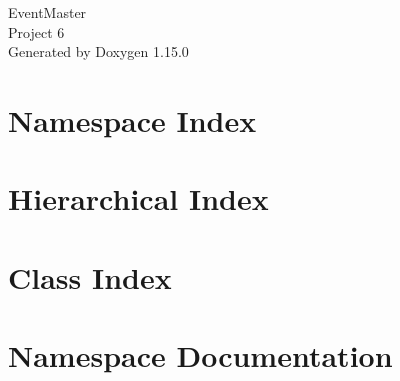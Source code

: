 \documentclass[twoside]{book}
\newcommand{\+}{\discretionary{\mbox{\scriptsize$\hookleftarrow$}}{}{}}
\newcommand{\clearemptydoublepage}{%
    \newpage{\pagestyle{empty}\cleardoublepage}%
  }
\begin{document}
  \raggedbottom
    \hypersetup{pageanchor=false,
                bookmarksnumbered=true,
                pdfencoding=unicode
               }
  \begin{titlepage}
  \vspace*{7cm}
  \begin{center}%
  {\Large Event\+Master}\\
  [1ex]\large Project 6 \\
  \vspace*{1cm}
  {\large Generated by Doxygen 1.15.0}\\
  \end{center}
  \end{titlepage}
  \clearemptydoublepage
  \tableofcontents
  \clearemptydoublepage
  \hypersetup{pageanchor=true}

\chapter{Namespace Index}

\chapter{Hierarchical Index}

\chapter{Class Index}

\chapter{Namespace Documentation}



















\end{document}

